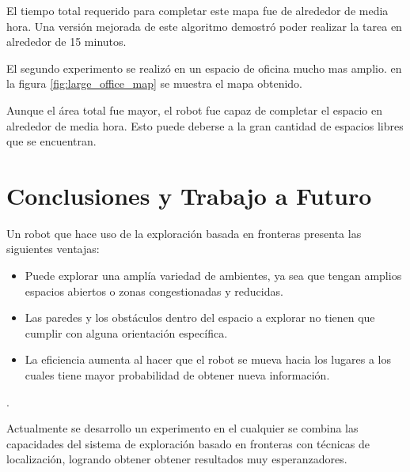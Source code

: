 \documentclass[12pt]{article}
\begin{document}
El tiempo total requerido para completar este mapa fue de alrededor de media hora. Una versión mejorada de este algoritmo demostró poder realizar la tarea en alrededor de 15 minutos.

El segundo experimento se realizó en un espacio de oficina mucho mas amplio. en la figura \ref{fig:large_office_map} se muestra el mapa obtenido.

Aunque el área total fue mayor, el robot fue capaz de completar el espacio en alrededor de media hora. Esto puede deberse a la gran cantidad de espacios libres que se encuentran.

\section{Conclusiones y Trabajo a Futuro}

Un robot que hace uso de la exploración basada en fronteras presenta las siguientes ventajas:

\begin{itemize}
	\item Puede explorar una amplía variedad de ambientes, ya sea que tengan amplios espacios abiertos o zonas congestionadas y reducidas.
	\item Las paredes y los obstáculos dentro del espacio a explorar no tienen que cumplir con alguna orientación específica.
	\item La eficiencia aumenta al hacer que el robot se mueva hacia los lugares a los cuales tiene mayor probabilidad de obtener nueva información.
\end{itemize}.

Actualmente se desarrollo un experimento en el cualquier se combina las capacidades del sistema de exploración basado en fronteras con técnicas de localización, logrando obtener obtener resultados muy esperanzadores.

%
%
\end{document}
